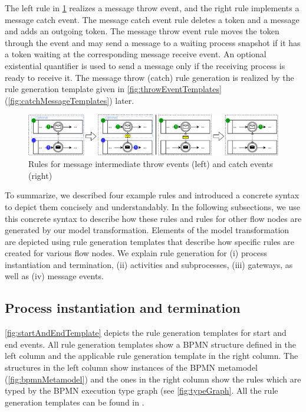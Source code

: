 \documentclass[submission, copyright, creativecommons]{eptcs}
\begin{document}
The left rule in \cref{fig:messageEventRules} realizes a message throw event, and the right rule implements a message catch event.
The message catch event rule deletes a token and a message and adds an outgoing token.
The message throw event rule moves the token through the event and may send a message to a waiting process snapshot if it has a token waiting at the corresponding message receive event.
An optional existential quantifier is used to send a message only if the receiving process is ready to receive it.
The message throw (catch) rule generation is realized by the rule generation template given in \autoref{fig:throwEventTemplates} (\autoref{fig:catchMessageTemplates}) later.

\begin{figure}[h]
    \centering
    \includegraphics[width=1\textwidth]{images/bpmn_semantics-message-events.pdf}
    \caption{Rules for message intermediate throw events (left) and catch events (right)}
    \label{fig:messageEventRules}
\end{figure}

To summarize, we described four example rules and introduced a concrete syntax to depict them concisely and understandably.
In the following subsections, we use this concrete syntax to describe how these rules and rules for other flow nodes are generated by our model transformation.
Elements of the model transformation are depicted using rule generation templates that describe how specific rules are created for various flow nodes.
We explain rule generation for (i) process instantiation and termination, (ii) activities and subprocesses, (iii) gateways, as well as (iv) message events.


\subsection{Process instantiation and termination} \label{subsec:instAndTermination}

\autoref{fig:startAndEndTemplate} depicts the rule generation templates for start and end events.
All rule generation templates show a BPMN structure defined in the left column and the applicable rule generation template in the right column.
The structures in the left column show instances of the BPMN metamodel (\autoref{fig:bpmnMetamodel}) and the ones in the right column show the rules which are typed by the BPMN execution type graph (see \autoref{fig:typeGraph}.
All the rule generation templates can be found in \cite{timkrauterArtifactsTERMGRAPH2022}.
\end{document}
